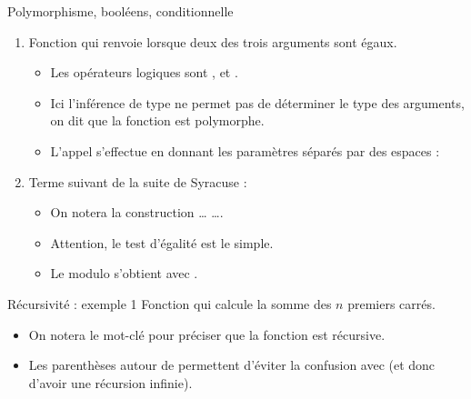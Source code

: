 \documentclass[10pt]{beamer}
\begin{document}
\begin{frame}{\Ctitle}{\stitle}
	\begin{exampleblock}{Polymorphisme, booléens, conditionnelle}
		\begin{enumerate}
			\item<1-> Fonction qui renvoie  lorsque deux des trois arguments sont égaux.
				\begin{itemize}
					\item<2-> Les opérateurs logiques sont \kw{\&\&}, \kw{||} et .
					\item<3-> Ici l'inférence de type ne permet pas de déterminer le type des arguments, on dit que la fonction est \textcolor{BrickRed}{polymorphe}.
					\item<4-> L'appel s'effectue en donnant les paramètres séparés par des espaces : 
				\end{itemize}
			\item<5-> Terme suivant de la suite de Syracuse :
				\begin{itemize}
					\item<6-> On notera la construction  \dots {} \dots {}.
					\item<7-> Attention, le test d'égalité est le \kw{=} simple.
					\item<8-> Le modulo s'obtient avec .
				\end{itemize}
		\end{enumerate}
	\end{exampleblock}
\end{frame}

\begin{frame}{\Ctitle}{\stitle}
	\begin{exampleblock}{Récursivité : exemple 1}
		Fonction qui calcule la somme des $n$ premiers carrés.
		\begin{itemize}
			\item<2-> On notera le mot-clé  pour préciser que la fonction est récursive.
			\item<3-> Les parenthèses autour de  permettent d'éviter la confusion avec  (et donc d'avoir une récursion infinie).
		\end{itemize}
	\end{exampleblock}
\end{frame}
\end{document}
